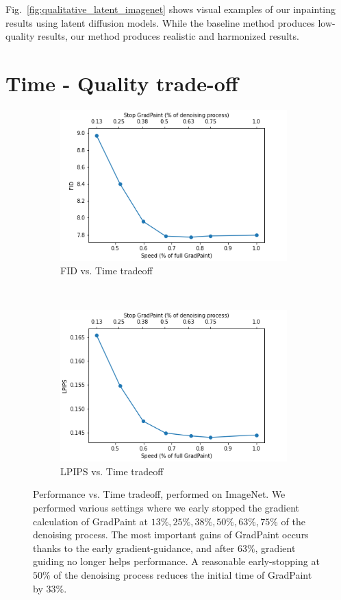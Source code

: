 Fig.~\ref{fig:qualitative_latent_imagenet} shows visual examples of our inpainting results using latent diffusion models. While the baseline method produces low-quality results, our method produces realistic and harmonized results.  


\section{Time - Quality trade-off}

\label{speed_section}

\begin{figure}[t!]
    \centering
    \begin{subfigure}[t]{0.5\linewidth}
        \centering
        \includegraphics[height=2.3in]{images/gradpaint/speed_fid.png}
        \caption{FID vs. Time tradeoff}
    \end{subfigure}%
    ~ 
    \begin{subfigure}[t]{0.5\linewidth}
        \centering
        \includegraphics[height=2.3in]{images/gradpaint/speed_lpips.png}
        \caption{LPIPS vs. Time tradeoff}
    \end{subfigure}
    \caption{Performance vs. Time tradeoff, performed on ImageNet. We performed various settings where we early stopped the gradient calculation of GradPaint at $13\%, 25\%, 38\%, 50\%, 63\%, 75\%$ of the denoising process. The most important gains of GradPaint occurs thanks to the early gradient-guidance, and after $63\%$, gradient guiding no longer helps performance. A reasonable early-stopping at $50\%$ of the denoising process reduces the initial time of GradPaint by $33\%$.}
    \label{timsvsacc}
\end{figure}

